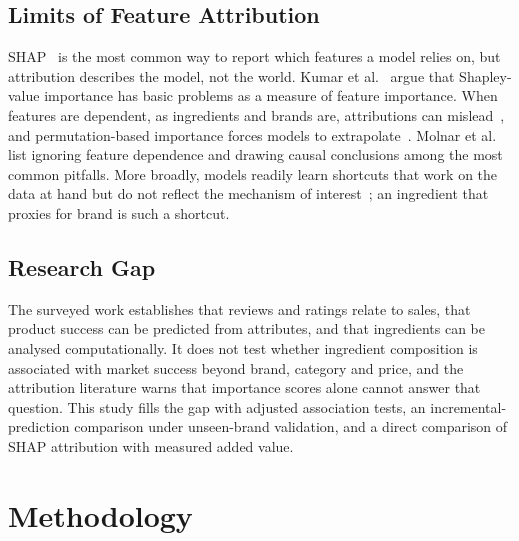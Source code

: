 \documentclass[11pt,a4paper]{article}
\newcommand{\draft}[1]{{\color{blue!70!black}#1}}
\begin{document}
\subsection{Limits of Feature Attribution}
\draft{SHAP~\cite{lundberg2017shap} is the most common way to report which features a model relies on, but attribution describes the model, not the world. Kumar et al.~\cite{kumar2020} argue that Shapley-value importance has basic problems as a measure of feature importance. When features are dependent, as ingredients and brands are, attributions can mislead~\cite{aas2021}, and permutation-based importance forces models to extrapolate~\cite{hooker2021}. Molnar et al.~\cite{molnar2022} list ignoring feature dependence and drawing causal conclusions among the most common pitfalls. More broadly, models readily learn shortcuts that work on the data at hand but do not reflect the mechanism of interest~\cite{geirhos2020}; an ingredient that proxies for brand is such a shortcut.}

\subsection{Research Gap}
\draft{The surveyed work establishes that reviews and ratings relate to sales, that product success can be predicted from attributes, and that ingredients can be analysed computationally. It does not test whether ingredient composition is associated with market success beyond brand, category and price, and the attribution literature warns that importance scores alone cannot answer that question. This study fills the gap with adjusted association tests, an incremental-prediction comparison under unseen-brand validation, and a direct comparison of SHAP attribution with measured added value.}

\section{Methodology}
\end{document}
